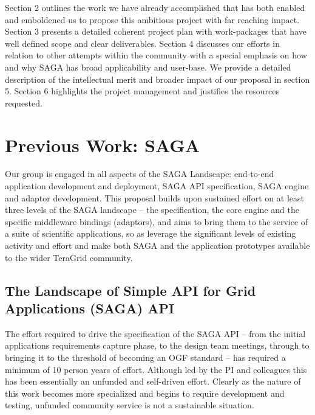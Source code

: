 \documentclass[10pt,letterpaper]{article}
\begin{document}
Section 2 outlines the work we have already accomplished that has both
enabled and emboldened us to propose this ambitious project with far
reaching impact. Section 3 presents a detailed coherent project plan
with work-packages that have well defined scope and clear
deliverables.  Section 4 discusses our efforts in relation to other
attempts within the community with a special emphasis on how and why
SAGA has broad applicability and user-base.  We provide a detailed
description of the intellectual merit and broader impact of our
proposal in section 5.  Section 6 highlights the project management
and justifies the resources requested.


\section{Previous Work: SAGA}
\label{sec:previous_work}


Our group is engaged in all aspects of the SAGA Landscape: end-to-end
application development and deployment, SAGA API specification, SAGA
engine and adaptor development.  This proposal builds upon sustained effort on at least three
levels of the SAGA landscape -- the specification, the core engine and
the specific middleware bindings (adaptors), and aims to bring them to
the service of a suite of scientific applications, so as leverage the
significant levels of existing activity and effort and make both
SAGA and the application prototypes available to the wider TeraGrid
community.

\subsection{The Landscape of Simple API for Grid Applications (SAGA) API} 

 The effort required to drive the specification of the
SAGA API -- from the initial applications requirements capture phase,
to the design team meetings, through to bringing it to the threshold
of becoming an OGF standard -- has required a minimum of 10 person
years of effort.  Although led by the PI and colleagues this has been
essentially an unfunded and self-driven effort.  Clearly as the nature
of this work becomes more specialized and begins to require
development and testing, unfunded community service is not a
sustainable situation.
\end{document}
